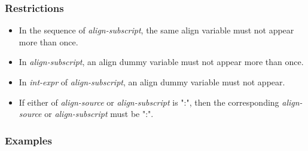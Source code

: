 \subsubsection*{Restrictions}

\begin{itemize}
\item In the
sequence of {\it align-subscript}, the same align variable must not appear
more than once. 
\item  In {\it align-subscript}, an align dummy variable must not
appear more than once. 
\item  In {\it int-expr} of {\it align-subscript}, an align
dummy variable must not appear.
\item  If either of {\it align-source} or {\it align-subscript} is
  ":", then the corresponding {\it align-source} or 
{\it align-subscript} must be ":". 
\end{itemize}

\subsubsection*{Examples}

